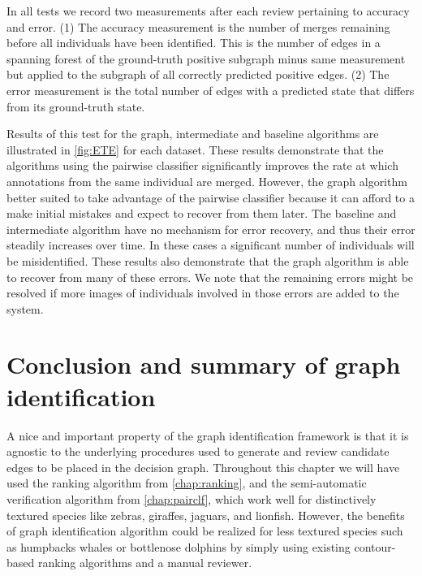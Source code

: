     In all tests we record two measurements after each review pertaining to accuracy and error. (1) The accuracy
    measurement is the number of merges remaining before all individuals have been identified. This is the number of
    edges in a spanning forest of the ground-truth positive subgraph minus same measurement but applied to the subgraph
    of all correctly predicted positive edges. (2) The error measurement is the total number of edges with a predicted
    state that differs from its ground-truth state.

    Results of this test for the graph, intermediate and baseline algorithms are illustrated in \cref{fig:ETE} for each
    dataset. These results demonstrate that the algorithms using the pairwise classifier significantly improves the rate
    at which annotations from the same individual are merged. However, the graph algorithm better suited to take
    advantage of the pairwise classifier because it can afford to a make initial mistakes and expect to recover from
    them later. The baseline and intermediate algorithm have no mechanism for error recovery, and thus their error
    steadily increases over time. In these cases a significant number of individuals will be misidentified. These
    results also demonstrate that the graph algorithm is able to recover from many of these errors. We note that the
    remaining errors might be resolved if more images of individuals involved in those errors are added to the system.

 
\section{Conclusion and summary of graph identification}\label{sec:graphconclusion}

A nice and important property of the graph identification framework is that it is agnostic to the underlying procedures
used to generate and review candidate edges to be placed in the decision graph. Throughout this chapter we will have
used the ranking algorithm from \cref{chap:ranking}, and the semi-automatic verification algorithm from
\cref{chap:pairclf}, which work well for distinctively textured species like zebras, giraffes, jaguars, and lionfish.
However, the benefits of graph identification algorithm could be realized for less textured species such as humpbacks
whales or bottlenose dolphins by simply using existing contour-based ranking algorithms and a manual reviewer.


